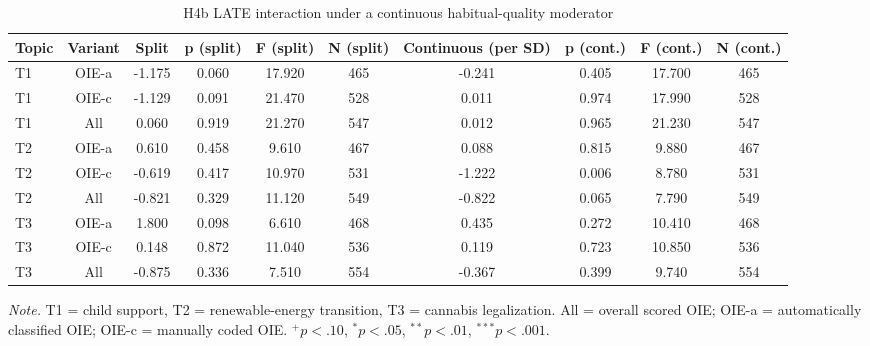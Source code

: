 \begin{table}[htbp]
\centering
\begin{threeparttable}
\caption{H4b LATE interaction under a continuous habitual-quality moderator}
\label{tab:tab_h4b_continuous}
\begin{tabular}{lccccccccc}
\toprule
  Topic & Variant & Split & p (split) & F (split) & N (split) & Continuous (per SD) & p (cont.) & F (cont.) & N (cont.) \\
\midrule
  T1 & OIE-a & -1.175 & 0.060 & 17.920 & 465 & -0.241 & 0.405 & 17.700 & 465 \\
  T1 & OIE-c & -1.129 & 0.091 & 21.470 & 528 & 0.011 & 0.974 & 17.990 & 528 \\
  T1 & All & 0.060 & 0.919 & 21.270 & 547 & 0.012 & 0.965 & 21.230 & 547 \\
  T2 & OIE-a & 0.610 & 0.458 & 9.610 & 467 & 0.088 & 0.815 & 9.880 & 467 \\
  T2 & OIE-c & -0.619 & 0.417 & 10.970 & 531 & -1.222 & 0.006 & 8.780 & 531 \\
  T2 & All & -0.821 & 0.329 & 11.120 & 549 & -0.822 & 0.065 & 7.790 & 549 \\
  T3 & OIE-a & 1.800 & 0.098 & 6.610 & 468 & 0.435 & 0.272 & 10.410 & 468 \\
  T3 & OIE-c & 0.148 & 0.872 & 11.040 & 536 & 0.119 & 0.723 & 10.850 & 536 \\
  T3 & All & -0.875 & 0.336 & 7.510 & 554 & -0.367 & 0.399 & 9.740 & 554 \\
\bottomrule
\end{tabular}
\begin{tablenotes}\footnotesize\item \textit{Note.} T1 = child support, T2 = renewable-energy transition, T3 = cannabis legalization. All = overall scored OIE; OIE-a = automatically classified OIE; OIE-c = manually coded OIE. $^{+}p<.10$, $^{*}p<.05$, $^{**}p<.01$, $^{***}p<.001$.\end{tablenotes}
\end{threeparttable}
\end{table}
